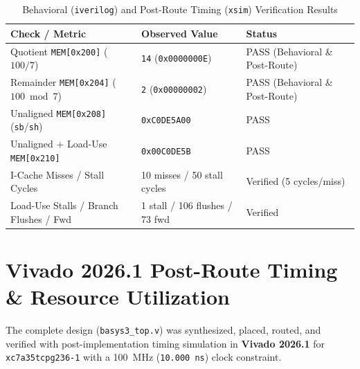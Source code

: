 \documentclass[11pt,a4paper]{article}
\begin{document}
\begin{table}[htbp]
\centering
\caption{Behavioral (\texttt{iverilog}) and Post-Route Timing (\texttt{xsim}) Verification Results}
\begin{tabular}{@{}lll@{}}
\toprule
\textbf{Check / Metric} & \textbf{Observed Value} & \textbf{Status} \\ \midrule
Quotient \texttt{MEM[0x200]} ($100 / 7$) & \texttt{14} (\texttt{0x0000000E}) & PASS (Behavioral \& Post-Route) \\
Remainder \texttt{MEM[0x204]} ($100 \bmod 7$) & \texttt{2} (\texttt{0x00000002}) & PASS (Behavioral \& Post-Route) \\
Unaligned \texttt{MEM[0x208]} (\texttt{sb}/\texttt{sh}) & \texttt{0xC0DE5A00} & PASS \\
Unaligned + Load-Use \texttt{MEM[0x210]} & \texttt{0x00C0DE5B} & PASS \\
I-Cache Misses / Stall Cycles & 10 misses / 50 stall cycles & Verified (5 cycles/miss) \\
Load-Use Stalls / Branch Flushes / Fwd & 1 stall / 106 flushes / 73 fwd & Verified \\ \bottomrule
\end{tabular}
\end{table}

\section{Vivado 2026.1 Post-Route Timing \& Resource Utilization}
The complete design (\texttt{basys3\_top.v}) was synthesized, placed, routed, and verified with post-implementation timing simulation in \textbf{Vivado 2026.1} for \texttt{xc7a35tcpg236-1} with a 100~MHz (\texttt{10.000~ns}) clock constraint.
\end{document}
